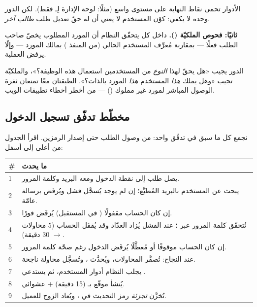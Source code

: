 الأدوار تحمى نقاط النهاية على مستوى واسع (مثلًا: لوحة الإدارة لِـ فقط).
لكن الدور وحده لا يكفي: كوْن المستخدم  لا يعني أن له حقّ تعديل طلب
\emph{طالب آخر}.

\textbf{ثانيًا: فحوص الملكيّة ().} داخل كل  يتحقّق
النظام أن المورد المطلوب يخصّ صاحب الطلب فعلًا — بمقارنة مُعرِّف المستخدم الحالي
(من المنفذ ) بمالك المورد — وإلّا يرفض العملية.

\begin{keyp}
الدور يجيب «هل يحقّ لهذا \emph{النوع} من المستخدمين استعمال هذه الوظيفة؟»، والملكيّة
تجيب «وهل يملك \emph{هذا} المستخدم \emph{هذا} المورد بالذات؟». الطبقتان معًا تمنعان
ثغرة الوصول المباشر لمورد غير مملوك () — من أخطر أخطاء تطبيقات الويب.
\end{keyp}

\subsection{مخطّط تدفّق تسجيل الدخول}

نجمع كل ما سبق في تدفّق واحد: من وصول الطلب حتى إصدار الرمزين. اقرأ الجدول من أعلى
إلى أسفل:

\begin{center}
\begin{tabular}{L{1.1cm} L{13.4cm}}
\toprule
\textbf{\color{spPrimary}\#} & \textbf{\color{spPrimary}ما يحدث} \\
 & يصل طلب  إلى نقطة الدخول ومعه البريد وكلمة المرور. \\
2 & يبحث  عن المستخدم بالبريد المُطبَّع؛ إن لم يوجد يُسجَّل فشل ويُرفَض برسالة عامّة. \\
3 & إن كان الحساب مقفولًا ( في المستقبل) يُرفَض فورًا. \\
4 & تُتحقّق كلمة المرور عبر ؛ عند الفشل يُزاد العدّاد وقد يُقفَل الحساب (5 محاولات $\rightarrow$ 30 دقيقة). \\
5 & إن كان الحساب موقوفًا أو مُعطَّلًا يُرفَض الدخول رغم صحّة كلمة المرور. \\
6 & عند النجاح: تُصفَّر المحاولات، ويُحدَّث ، وتُسجَّل محاولة ناجحة. \\
7 & يجلب النظام أدوار المستخدم، ثم يستدعي . \\
8 & يُنشأ  موقّع بـ (15 دقيقة) $+$  عشوائي. \\
9 & تُخزَّن \emph{تجزئة} رمز التحديث في ، ويُعاد الزوج للعميل. \\
\bottomrule
\end{tabular}
\end{center}

